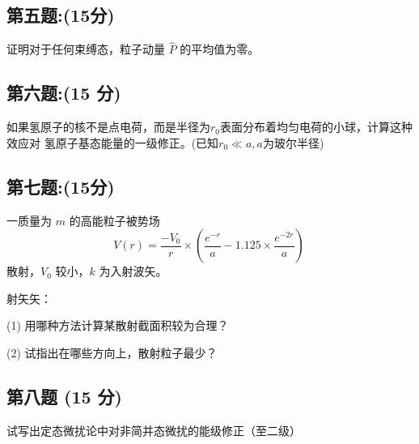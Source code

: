 \subsection{第五题:(15分)}
证明对于任何束缚态，粒子动量 $\hat{P}$ 的平均值为零。
\subsection{第六题:(15 分)}
如果氢原子的核不是点电荷，而是半径为$r_0$表面分布着均匀电荷的小球，计算这种效应对
氢原子基态能量的一级修正。(已知$r_0 \ll a,a$为玻尔半径)
\subsection{第七题:(15分)}
一质量为 $m$ 的高能粒子被势场
\[V(r) = \frac{-V_0}{r} \times \left( {\frac{e^{-r}}{a}} - 1.125 \times {\frac{e^{-2r}}{a}} \right)~\]
散射，$V_0$ 较小，$k$ 为入射波矢。

射矢矢：

(1) 用哪种方法计算某散射截面积较为合理？

(2) 试指出在哪些方向上，散射粒子最少？
\subsection{第八题 (15 分)}
试写出定态微扰论中对非简并态微扰的能级修正（至二级）